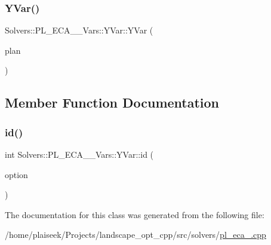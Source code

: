 \subsubsection{\texorpdfstring{Y\+Var()}{YVar()}}
{\footnotesize\ttfamily Solvers\+::\+P\+L\+\_\+\+E\+C\+A\+\_\+\_\+\+Vars\+::\+Y\+Var\+::\+Y\+Var (\begin{DoxyParamCaption}\item[{const \hyperlink{class_restoration_plan}{Restoration\+Plan} \&}]{plan }\end{DoxyParamCaption})\hspace{0.3cm}{\ttfamily [inline]}}



\subsection{Member Function Documentation}
\mbox{\label{class_solvers_1_1_p_l___e_c_a__2___vars_1_1_y_var_aa36d75e4a0ce6e89744070a658d0d2e0}} 
\subsubsection{\texorpdfstring{id()}{id()}}
{\footnotesize\ttfamily int Solvers\+::\+P\+L\+\_\+\+E\+C\+A\+\_\+\_\+\+Vars\+::\+Y\+Var\+::id (\begin{DoxyParamCaption}\item[{const \hyperlink{class_restoration_plan_1_1_option}{Restoration\+Plan\+::\+Option} $\ast$}]{option }\end{DoxyParamCaption})\hspace{0.3cm}{\ttfamily [inline]}}



The documentation for this class was generated from the following file\+:\begin{DoxyCompactItemize}
\item 
/home/plaiseek/\+Projects/landscape\+\_\+opt\+\_\+cpp/src/solvers/\hyperlink{pl__eca__2_8cpp}{pl\+\_\+eca\+\_.\+cpp}\end{DoxyCompactItemize}

